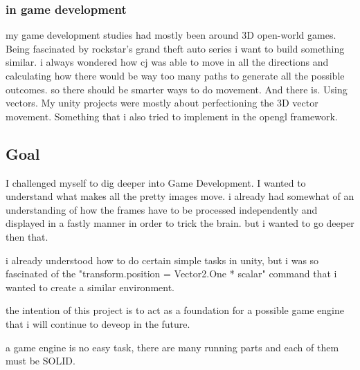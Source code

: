             \subsubsection{in game development}
                my game development studies had mostly been around 3D open-world games. Being fascinated by rockstar's grand theft auto series i want to build something similar. i always wondered how cj was able to move in all the directions and calculating how there would be way too many paths to generate all the possible outcomes. so there should be smarter ways to do movement.
                And there is. Using vectors.
                My unity projects were mostly about perfectioning the 3D vector movement. Something that i also tried to implement in the opengl framework.   

        \subsection{Goal}
            I challenged myself to dig deeper into Game Development. I wanted to understand what makes all the pretty images move. i already had somewhat of an understanding of how the frames have to be processed independently and displayed in a fastly manner in order to trick the brain. but i wanted to go deeper then that.

            i already understood how to do certain simple tasks in unity, but i was so fascinated of the "transform.position = Vector2.One * scalar" command that i wanted to create a similar environment. 




            the intention of this project is to act as a foundation for a possible game engine that i will continue to deveop in the future. 

            a game engine is no easy task, there are many running parts and each of them must be SOLID. 




